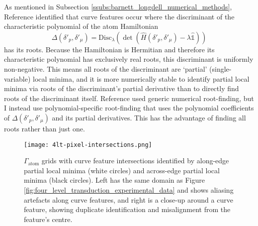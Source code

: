 As mentioned in Subsection \ref{ssubs:barnett_longdell_numerical_methods}, Reference \cite{barnett_longdell_2020} identified that curve features occur where the discriminant of the characteristic polynomial of the atom Hamiltonian
\begin{equation}
    \Delta(\delta'_p, \delta'_\mu) = \text{Disc}_\lambda\left(\det\left(\hat{H}(\delta'_p, \delta'_\mu)-\lambda\hat{\mathds{1}}\right)\right)
\end{equation}
has its roots. Because the Hamiltonian is Hermitian and therefore its characteristic polynomial has exclusively real roots, this discriminant is uniformly non-negative. This means all roots of the discriminant are `partial' (single-variable) local minima, and it is more numerically stable to identify partial local minima via roots of the discriminant's partial derivative than to directly find roots of the discriminant itself\cite{barnett_msc}. Reference \cite{barnett_longdell_2020} used generic numerical root-finding, but I instead use polynomial-specific root-finding that uses the polynomial coefficients of $\Delta(\delta'_p, \delta'_\mu)$ and its partial derivatives. This has the advantage of finding all roots rather than just one.

\begin{figure}[h!]
\centering
\texttt{[image: 4lt-pixel-intersections.png]}
\caption{\label{fig:pixel_intersections} $\Gamma_\text{atom}$ grids with curve feature intersections identified by along-edge partial local minima (white circles) and across-edge partial local minima (black circles). Left has the same domain as Figure \ref{fig:four_level_transduction_experimental_data} and shows aliasing artefacts along curve features, and right is a close-up around a curve feature, showing duplicate identification and misalignment from the feature's centre.}
\end{figure}

